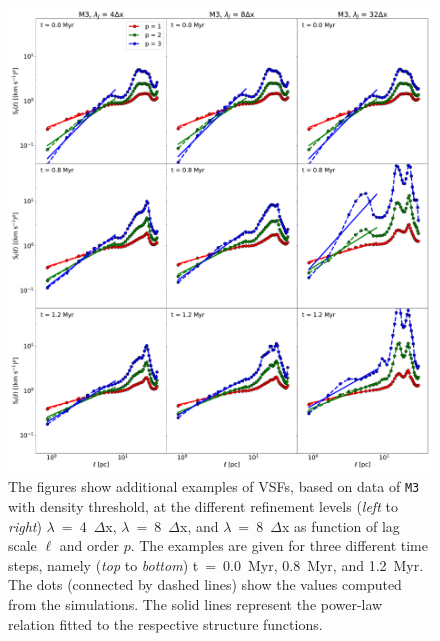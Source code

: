 	
\begin{figure}
    \centering
    \includegraphics[width=\textwidth]{app_examples_jeans_s_l.pdf}
    \caption{
        The figures show additional examples of VSFs, based on data of \texttt{M3} with density threshold, at the different refinement levels (\textit{left} to \textit{right}) $\lambda$~=~4~$\Delta$x, $\lambda$~=~8~$\Delta$x, and $\lambda$~=~8~$\Delta$x as function of lag scale $\ell$ and order $p$. 
        The examples are given for three different time steps, namely (\textit{top} to \textit{bottom}) t~=~0.0~Myr, 0.8~Myr, and 1.2~Myr.
        The dots (connected by dashed lines) show the values computed from the simulations. 
        The solid lines represent the power-law relation fitted to the respective structure functions.
    }
    \label{pic:appInertial:examples_jeans_s_vs_l}
\end{figure}


